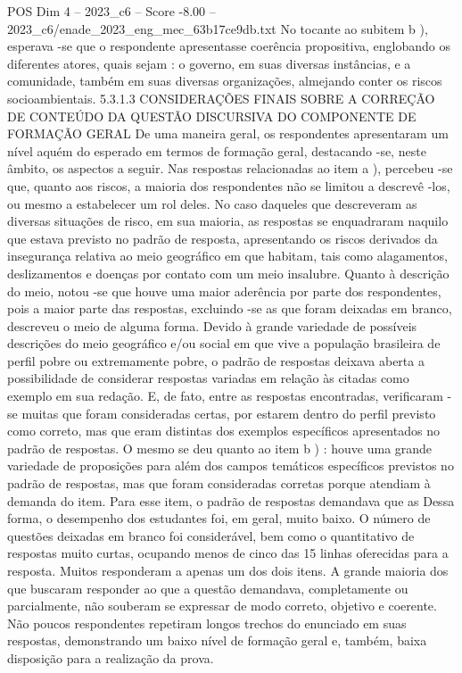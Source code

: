 \begin{textsample}{POS Dim 4 – 2023\_c6 – Score -8.00 – 2023\_c6/enade\_2023\_eng\_mec\_63b17ce9db.txt}
No tocante ao subitem b ), esperava -se que o respondente apresentasse coerência propositiva, englobando os diferentes atores, quais sejam : o governo, em suas diversas instâncias, e a comunidade, também em suas diversas organizações, almejando conter os riscos socioambientais. 5.3.1.3 CONSIDERAÇÕES FINAIS SOBRE A CORREÇÃO DE CONTEÚDO DA QUESTÃO DISCURSIVA DO COMPONENTE DE FORMAÇÃO GERAL De uma maneira geral, os respondentes apresentaram um nível aquém do esperado em termos de formação geral, destacando -se, neste âmbito, os aspectos a seguir.
Nas respostas relacionadas ao item a ), percebeu -se que, quanto aos riscos, a maioria dos respondentes não se limitou a descrevê -los, ou mesmo a estabelecer um rol deles.
No caso daqueles que descreveram as diversas situações de risco, em sua maioria, as respostas se enquadraram naquilo que estava previsto no padrão de resposta, apresentando os riscos derivados da insegurança relativa ao meio geográfico em que habitam, tais como alagamentos, deslizamentos e doenças por contato com um meio insalubre.
Quanto à descrição do meio, notou -se que houve uma maior aderência por parte dos respondentes, pois a maior parte das respostas, excluindo -se as que foram deixadas em branco, descreveu o meio de alguma forma.
Devido à grande variedade de possíveis descrições do meio geográfico e/ou social em que vive a população brasileira de perfil pobre ou extremamente pobre, o padrão de respostas deixava aberta a possibilidade de considerar respostas variadas em relação às citadas como exemplo em sua redação.
E, de fato, entre as respostas encontradas, verificaram -se muitas que foram consideradas certas, por estarem dentro do perfil previsto como correto, mas que eram distintas dos exemplos específicos apresentados no padrão de respostas.
O mesmo se deu quanto ao item b ) : houve uma grande variedade de proposições para além dos campos temáticos específicos previstos no padrão de respostas, mas que foram consideradas corretas porque atendiam à demanda do item.
Para esse item, o padrão de respostas demandava que as Dessa forma, o desempenho dos estudantes foi, em geral, muito baixo.
O número de questões deixadas em branco foi considerável, bem como o quantitativo de respostas muito curtas, ocupando menos de cinco das 15 linhas oferecidas para a resposta.
Muitos responderam a apenas um dos dois itens.
A grande maioria dos que buscaram responder ao que a questão demandava, completamente ou parcialmente, não souberam se expressar de modo correto, objetivo e coerente.
Não poucos respondentes repetiram longos trechos do enunciado em suas respostas, demonstrando um baixo nível de formação geral e, também, baixa disposição para a realização da prova.

\end{textsample}
